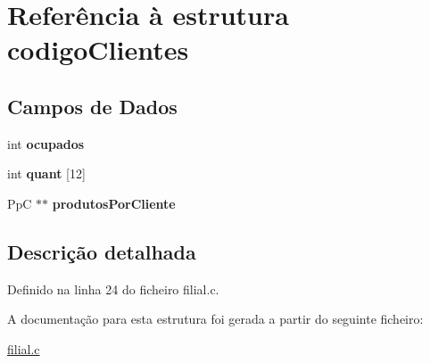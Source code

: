 \hypertarget{structcodigoClientes}{}\section{Referência à estrutura codigo\+Clientes}
\label{structcodigoClientes}
\subsection*{Campos de Dados}
\begin{DoxyCompactItemize}
\item 
\mbox{\label{structcodigoClientes_ab926abd92c7517c9198726307524b9d5}} 
int {\bfseries ocupados}
\item 
\mbox{\label{structcodigoClientes_a6e2e0fb3cea22b0304b50c980e0323e4}} 
int {\bfseries quant} \mbox{[}12\mbox{]}
\item 
\mbox{\label{structcodigoClientes_a318d8407ba4e3d67134885e19ed3dcaf}} 
PpC $\ast$$\ast$ {\bfseries produtos\+Por\+Cliente}
\end{DoxyCompactItemize}


\subsection{Descrição detalhada}


Definido na linha 24 do ficheiro filial.\+c.



A documentação para esta estrutura foi gerada a partir do seguinte ficheiro\+:\begin{DoxyCompactItemize}
\item 
\hyperlink{filial_8c}{filial.\+c}\end{DoxyCompactItemize}
